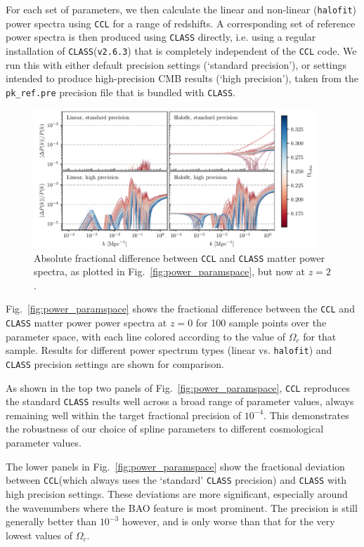 \documentclass[\docopts]{\docclass}
\newcommand{\ccl}{{\tt CCL}\xspace}
\newcommand{\halofit}{{\tt halofit}\xspace}
\newcommand{\class}{{\tt CLASS}\xspace}
\begin{document}
For each set of parameters, we then calculate the linear and non-linear (\halofit) power spectra using \ccl for a range of redshifts. A corresponding set of reference power spectra is then produced using \class directly, i.e. using a regular installation of \class ({\tt v2.6.3}) that is completely independent of the \ccl code. We run this with either default precision settings (`standard precision'), or settings intended to produce high-precision CMB results (`high precision'), taken from the {\tt pk\_ref.pre} precision file that is bundled with \class.

\begin{figure}
\centering
\includegraphics[width=0.95\textwidth]{pkdev_v2_z2_00}
\caption{Absolute fractional difference between \ccl and \class matter power spectra, as plotted in Fig.~\ref{fig:power_paramspace}, but now at $z=2$.}
\label{fig:power_paramspace_z2}
\end{figure}

Fig.~\ref{fig:power_paramspace} shows the fractional difference between the \ccl and \class matter power power spectra at $z=0$ for 100 sample points over the parameter space, with each line colored according to the value of $\Omega_c$ for that sample. Results for different power spectrum types (linear vs. \halofit) and \class precision settings are shown for comparison.

As shown in the top two panels of Fig.~\ref{fig:power_paramspace}, \ccl reproduces the standard \class results well across a broad range of parameter values, always remaining well within the target fractional precision of $10^{-4}$. This demonstrates the robustness of our choice of spline parameters to different cosmological parameter values.

The lower panels in Fig.~\ref{fig:power_paramspace} show the fractional deviation between \ccl (which always uses the `standard' \class precision) and \class with high precision settings. These deviations are more significant, especially around the wavenumbers where the BAO feature is most prominent. The precision is still generally better than $10^{-3}$ however, and is only worse than that for the very lowest values of $\Omega_c$.
\end{document}
